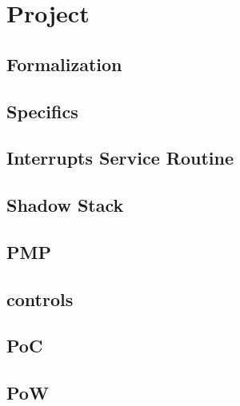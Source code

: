\chapter{Project}
\label{cha:Project}

\lipsum[1]

\section{Formalization}
\label{cha:project_Formalization}

\lipsum[1]

\section{Specifics}
\label{cha:project_Specifics}

\lipsum[1]

\section{Interrupts Service Routine}
\label{cha:project_Interrupts-Service-Routine}

\lipsum[1]

\section{Shadow Stack}
\label{cha:project_Shadow-Stack}

\lipsum[1]

\section{PMP}
\label{cha:project_PMP}

\lipsum[1]

\section{controls}
\label{cha:project_controls}

\lipsum[1]

\section{PoC}
\label{cha:project_PoC}

\lipsum[1]

\section{PoW}
\label{cha:project_PoW}

\lipsum[1]